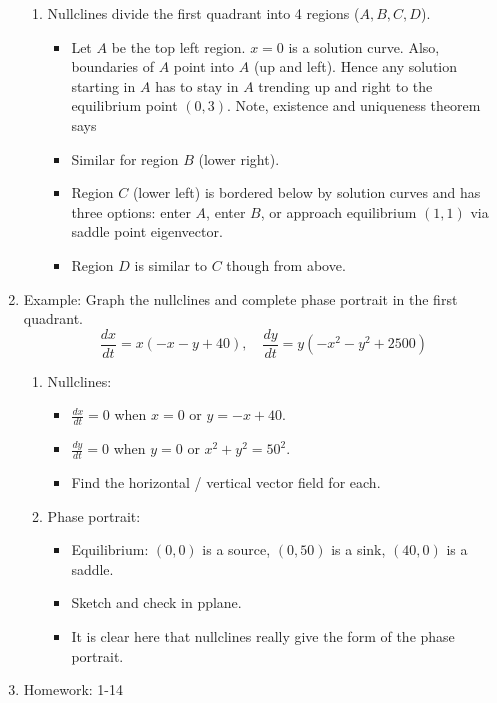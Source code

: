 \documentclass{article}
\begin{document}
\begin{enumerate}
\begin{enumerate}
\item Nullclines divide the first quadrant into 4 regions ($A,B,C,D$). 
\begin{itemize}
\item Let $A$ be the top left region. $x=0$ is a solution curve. Also, boundaries of $A$ point into $A$ (up and left). Hence any solution starting in $A$ has to stay in $A$ trending up and right to the equilibrium point $(0,3)$. Note, existence and uniqueness theorem says
\item Similar for region $B$ (lower right).
\item Region $C$ (lower left) is bordered below by solution curves and has three options: enter $A$, enter $B$, or approach equilibrium $(1,1)$ via saddle point eigenvector.
\item Region $D$ is similar to $C$ though from above.
\end{itemize}
\end{enumerate}

\item Example: Graph the nullclines and complete phase portrait in the first quadrant.
\[
\frac{dx}{dt} = x(-x-y+40), \quad \frac{dy}{dt}=y(-x^2-y^2+2500)
\]
\begin{enumerate}
\item Nullclines:
\begin{itemize}
\item $\frac{dx}{dt}=0$ when $x=0$ or $y=-x+40$. 
\item $\frac{dy}{dt}=0$ when $y=0$ or $x^2+y^2 = 50^2$.
\item Find the horizontal / vertical vector field for each. 
\end{itemize}

\item Phase portrait:
\begin{itemize}
\item Equilibrium: $(0,0)$ is a source, $(0,50)$ is a sink, $(40,0)$ is a saddle.
\item Sketch and check in pplane.
\item It is clear here that nullclines really give the form of the phase portrait.
\end{itemize}

\end{enumerate}

\item Homework: 1-14

\end{enumerate}
\end{document}
